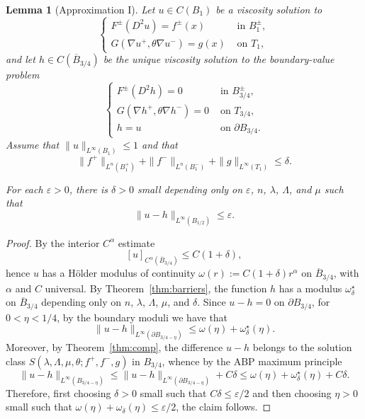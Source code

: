 \documentclass[letter,11pt]{amsart}
\newcommand{\vep}{\varepsilon}
\newtheorem{lem}[thm]{Lemma}
\theoremstyle{definition}
\numberwithin{equation}{section}
\begin{document}
\begin{lem}
[Approximation I]
\label{lem:silly}
Let $u \in C(B_1)$ be a viscosity solution to 
\[
\begin{cases}
F^{\pm}(D^2 u) = f^{\pm}(x) & \text{ in } B_{1}^{\pm},\\
G(\nabla u^{+}, \theta \nabla u^{-}) = g(x) & \text{ on } T_{1},
\end{cases}
\]
and let $h \in C(\overline{B}_{3/4})$ be the unique viscosity solution to the boundary-value problem
\[
\begin{cases}
F^{\pm}(D^2 h) = 0 & \text{ in } B_{3/4}^{\pm},\\
G(\nabla h^{+}, \theta \nabla h^{-}) = 0 & \text{ on } T_{3/4},\\
h = u & \text{ on } \partial B_{3/4}.
\end{cases}
\]
Assume that $\|u\|_{L^{\infty}(B_1)} \leq 1$ and that
\[
\|f^{+}\|_{L^{n}(B^{+}_{1})}  + \|f^{-} \|_{L^{n}(B^{-}_{1})} + \|g \|_{L^{\infty}(T_{1})} \leq \delta.
\]

For each $\vep > 0$, there is $\delta >0$ small depending only on $\vep$, $n$, $\lambda$, $\Lambda$, and $\mu$ such that 
\[
\|u - h\|_{L^{\infty}(B_{1/2})} 
\leq \vep.
\]
\end{lem}
\begin{proof}
By the interior $C^{\alpha}$ estimate
\[
[u]_{C^{\alpha}(\overline{B}_{3/4})} \leq C (1 + \delta),
\]
hence $u$ has a H\"{o}lder modulus of continuity $\omega(r) := C(1+\delta) r^{\alpha}$ on $\overline{B}_{3/4}$,
with $\alpha$ and $C$ universal.
By Theorem~\ref{thm:barriers}, the function $h$ has a modulus $\omega_{\delta}^{\star}$ on $\overline{B}_{3/4}$
depending only on $n$, $\lambda$, $\Lambda$, $\mu$, and $\delta$.
Since $u - h = 0$ on $\partial B_{3/4}$, 
for $0 < \eta < 1/4$,
by the boundary moduli we have that
\[
\|u - h\|_{L^{\infty}(\partial B_{3/4 - \eta})}
\leq \omega(\eta) + \omega^{\star}_\delta(\eta).
\]
Moreover, by Theorem~\ref{thm:comp}, the difference $u-h$ belongs to the solution class $S(\lambda, \Lambda, \mu, \theta; f^{+}, f^{-}, g)$ in $B_{3/4}$, whence by the ABP maximum principle
\[
\|u -h\|_{L^{\infty}(B_{3/4-\eta})}
\leq \|u -h\|_{L^{\infty}(\partial B_{3/4-\eta})} + C \delta
\leq \omega(\eta)+ \omega_{\delta}^{\star}(\eta) + C \delta.
\]
Therefore, first choosing $\delta >0$ small such that $C \delta \leq \vep/2$ and then choosing $\eta > 0$ small such that $\omega(\eta) + \omega_{\delta}(\eta) \leq \vep/2$, the claim follows.
\end{proof}
\end{document}
